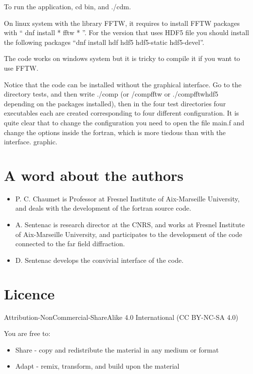 To run the application, cd bin, and ./cdm.


On linux system with the library FFTW, it requires to install FFTW
packages with `` dnf install * fftw * ''. For the version that uses
HDF5 file you should install the following packages ``dnf install hdf
hdf5 hdf5-static hdf5-devel''.

The code works on windows system but it is tricky to compile it if you
want to use FFTW.

Notice that the code can be installed without the graphical interface.
Go to the directory tests, and then write ./comp (or /compfftw or
./compfftwhdf5 depending on the packages installed), then in the four
test directories four executables each are created corresponding to
four different configuration. It is quite clear that to change the
configuration you need to open the file main.f and change the options
inside the fortran, which is more tiedous than with the interface.
graphic.

\section{A word about the authors}

\begin{itemize}
\item P. C. Chaumet is Professor at Fresnel Institute of Aix-Marseille
  University, and deals with the development of the fortran source
  code.
\item A. Sentenac is research director at the CNRS, and works at
  Fresnel Institute of Aix-Marseille University, and participates to
  the development of the code connected to the far field diffraction.
\item D. Sentenac develops the convivial interface of the code.
\end{itemize}

\section{Licence}


Attribution-NonCommercial-ShareAlike 4.0 International (CC BY-NC-SA 4.0)

You are free to:

\begin{itemize}
\item Share - copy and redistribute the material in any medium or
  format
\item Adapt - remix, transform, and build upon the material
\end{itemize}

